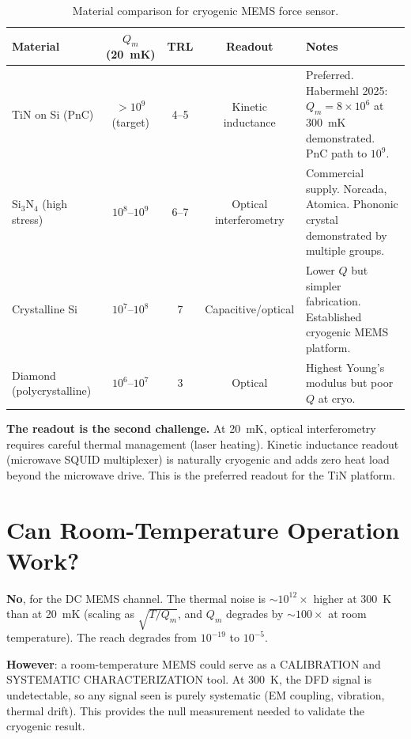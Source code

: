 \documentclass[11pt]{article}
\newcommand{\ee}[1]{\times 10^{#1}}
\theoremstyle{definition}
\theoremstyle{remark}
\begin{document}
\begin{table}[H]
\centering
\caption{Material comparison for cryogenic MEMS force sensor.}
\label{tab:materials}
\renewcommand{\arraystretch}{1.3}
\begin{tabular}{@{}p{3cm}cccp{4cm}@{}}
\toprule
\textbf{Material} & \textbf{$Q_m$ (20~mK)} & \textbf{TRL}
& \textbf{Readout} & \textbf{Notes} \\
\midrule
\rowcolor{rowok}
TiN on Si (PnC) & $>10^9$ (target) & 4--5
& Kinetic inductance & Preferred. Habermehl 2025: $Q_m = 8\ee{6}$
  at 300~mK demonstrated. PnC path to $10^9$. \\
\rowcolor{rowok}
Si$_3$N$_4$ (high stress) & $10^8$--$10^9$ & 6--7
& Optical interferometry & Commercial supply. Norcada, Atomica.
  Phononic crystal demonstrated by multiple groups. \\
\rowcolor{rowmed}
Crystalline Si & $10^7$--$10^8$ & 7
& Capacitive/optical & Lower $Q$ but simpler fabrication.
  Established cryogenic MEMS platform. \\
\rowcolor{rowhi}
Diamond (polycrystalline) & $10^6$--$10^7$ & 3
& Optical & Highest Young's modulus but poor $Q$ at cryo. \\
\bottomrule
\end{tabular}
\end{table}

\textbf{The readout is the second challenge.} At 20~mK, optical
interferometry requires careful thermal management (laser heating).
Kinetic inductance readout (microwave SQUID multiplexer) is
naturally cryogenic and adds zero heat load beyond the microwave
drive. This is the preferred readout for the TiN platform.

\section{Can Room-Temperature Operation Work?}

\textbf{No}, for the DC MEMS channel. The thermal noise is
$\sim 10^{12}\times$ higher at 300~K than at 20~mK (scaling as
$\sqrt{T/Q_m}$, and $Q_m$ degrades by $\sim 100\times$ at room
temperature). The reach degrades from $10^{-19}$ to $10^{-5}$.

\textbf{However}: a room-temperature MEMS could serve as a
CALIBRATION and SYSTEMATIC CHARACTERIZATION tool. At 300~K,
the DFD signal is undetectable, so any signal seen is purely
systematic (EM coupling, vibration, thermal drift). This provides
the null measurement needed to validate the cryogenic result.
\end{document}
